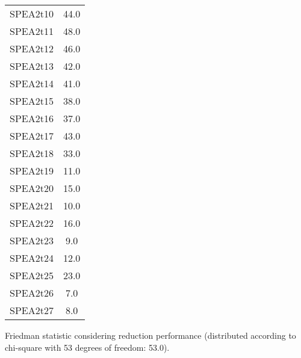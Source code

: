 \documentclass{article}
\begin{document}
\begin{table}[!htp]
\begin{tabular}{c|c}
SPEA2t10&44.0\\
SPEA2t11&48.0\\
SPEA2t12&46.0\\
SPEA2t13&42.0\\
SPEA2t14&41.0\\
SPEA2t15&38.0\\
SPEA2t16&37.0\\
SPEA2t17&43.0\\
SPEA2t18&33.0\\
SPEA2t19&11.0\\
SPEA2t20&15.0\\
SPEA2t21&10.0\\
SPEA2t22&16.0\\
SPEA2t23&9.0\\
SPEA2t24&12.0\\
SPEA2t25&23.0\\
SPEA2t26&7.0\\
SPEA2t27&8.0\\
\end{tabular}
\end{table}


Friedman statistic considering reduction performance (distributed according to chi-square with 53 degrees of freedom: 53.0).
\end{document}
